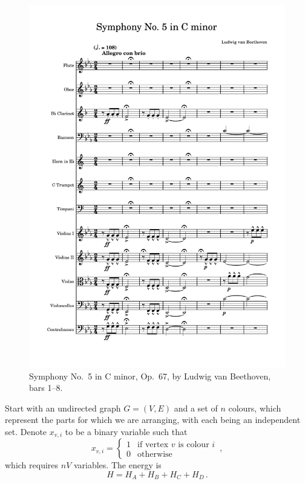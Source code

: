 \documentclass[12pt]{article}
\theoremstyle{definition}
\begin{document}
\begin{figure}
    \includegraphics[width=\textwidth,page=1]{beethoven-op67.pdf}
    \caption{Symphony No.\ 5 in C minor, Op.\ 67, by Ludwig van Beethoven, bars 1--8.}
\end{figure}

Start with an undirected graph $G=(V,E)$ and a set of $n$ colours, which represent the parts for which we are arranging, with each being an independent set. Denote $x_{v,i}$ to be a binary variable such that
\begin{equation*}
    x_{v,i} =
    \begin{cases}
        1 & \text{if vertex $v$ is colour $i$} \\
        0 & \text{otherwise}
    \end{cases}
    \,,
\end{equation*}
which requires $nV$ variables. The energy is
\begin{equation*}
    H = H_A + H_B + H_C + H_D \,.
\end{equation*}
\end{document}

